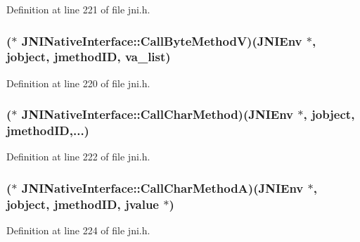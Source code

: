 Definition at line 221 of file jni.\-h.

\hypertarget{struct_j_n_i_native_interface_adf6fb13494e495c8e4c4a13d0353ca9f}{
\subsubsection[{Call\-Byte\-Method\-V}]{($\ast$ J\-N\-I\-Native\-Interface\-::\-Call\-Byte\-Method\-V)({\bf J\-N\-I\-Env} $\ast$, {\bf jobject}, {\bf jmethod\-I\-D}, va\-\_\-list)}}\label{struct_j_n_i_native_interface_adf6fb13494e495c8e4c4a13d0353ca9f}


Definition at line 220 of file jni.\-h.

\hypertarget{struct_j_n_i_native_interface_ac97259c422d24e5bd95108c4e028d098}{
\subsubsection[{Call\-Char\-Method}]{($\ast$ J\-N\-I\-Native\-Interface\-::\-Call\-Char\-Method)({\bf J\-N\-I\-Env} $\ast$, {\bf jobject}, {\bf jmethod\-I\-D},...)}}\label{struct_j_n_i_native_interface_ac97259c422d24e5bd95108c4e028d098}


Definition at line 222 of file jni.\-h.

\hypertarget{struct_j_n_i_native_interface_a05aca8328f6addee76e20934f07bee60}{
\subsubsection[{Call\-Char\-Method\-A}]{($\ast$ J\-N\-I\-Native\-Interface\-::\-Call\-Char\-Method\-A)({\bf J\-N\-I\-Env} $\ast$, {\bf jobject}, {\bf jmethod\-I\-D}, {\bf jvalue} $\ast$)}}\label{struct_j_n_i_native_interface_a05aca8328f6addee76e20934f07bee60}


Definition at line 224 of file jni.\-h.

